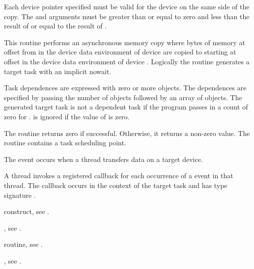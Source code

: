 \constraints
Each device pointer specified must be valid for the device on the same side
of the copy. The  and
 arguments must be greater than or equal to zero and
less than the result of  or equal to
the result of .

\effect
This routine performs an asynchronous memory copy where
 bytes of memory at offset  from 
in the device data environment of device  are
copied to  starting at offset  in the device data
environment of device .
Logically the  routine generates a target task with an implicit nowait.

Task dependences are expressed with zero or more 
objects. The dependences are specified by passing the
number of  objects followed by an array of
 objects.  The generated target task is not a
dependent task if the program passes in a count of zero for
.   is ignored if
the value of  is zero.

The routine returns zero if successful.
Otherwise, it returns a non-zero value. The
routine contains a task scheduling point.

\events
The  event occurs when a thread transfers data on a target device.

\tools
A thread invokes a registered 
callback for each occurrence of a  event in that
thread. The callback occurs in the context of the target task and has
type signature .

\begin{crossrefs}
\item {} construct, see .

\item {}, see .

\item {} routine, see
.

\item {}, see
.

\end{crossrefs}


